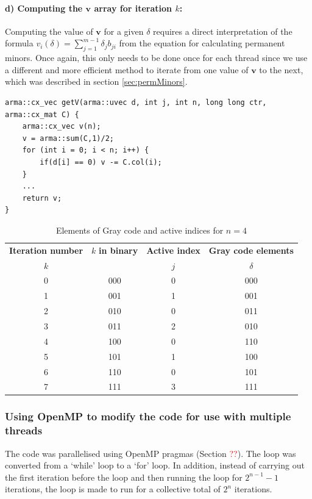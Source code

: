\documentclass[11pt]{article}
\theoremstyle{theorem}
\theoremstyle{remark}
\theoremstyle{plain}
\theoremstyle{definition}
\begin{document}
\paragraph{d) Computing the $\mathbf{v}$ array for iteration $k$:} Computing the value of $\mathbf{v}$ for a given $\delta$ requires a direct interpretation of the formula $v_i (\delta) = \sum_{j=1}^{m-1} \delta_j b_{ji}$ from the equation for calculating permanent minors. Once again, this only needs to be done once for each thread since we use a different and more efficient method to iterate from one value of $\mathbf{v}$ to the next, which was described in section \ref{sec:permMinors}.
\begin{verbatim}
arma::cx_vec getV(arma::uvec d, int j, int n, long long ctr, arma::cx_mat C) {
    arma::cx_vec v(n);
    v = arma::sum(C,1)/2;
    for (int i = 0; i < n; i++) {
        if(d[i] == 0) v -= C.col(i);
    }
    ...
    return v;
}
\end{verbatim}

\begin{table}
  \begin{center}
    \caption{Elements of Gray code and active indices for $n = 4$}
    \label{tab:graycode}
    \begin{tabular}{c|c|c|c}
      \textbf{Iteration number} & $k$ \textbf{in binary} & \textbf{Active index} & \textbf{Gray code elements}\\
      $k$ & & $j$ & $\delta$\\
      \hline
      0 & 000 & 0 & 000 \\
      1 & 001 & 1 & 001 \\
      2 & 010 & 0 & 011 \\
      3 & 011 & 2 & 010 \\
      4 & 100 & 0 & 110 \\
      5 & 101 & 1 & 100 \\
      6 & 110 & 0 & 101 \\
      7 & 111 & 3 & 111 \\
    \end{tabular}
  \end{center}
\end{table}

\subsubsection{Using OpenMP to modify the code for use with multiple threads}
The code was parallelised using OpenMP pragmas (Section \textcolor{red}{??}). The loop was converted from a `while' loop to a `for' loop. In addition, instead of carrying out the first iteration before the loop and then running the loop for $2^{n-1} -1$ iterations, the loop is made to run for a collective total of $2^n$ iterations.
\end{document}
